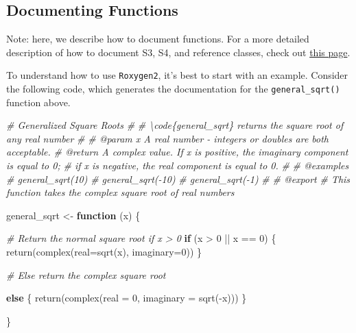 \documentclass[
]{book}
\newenvironment{Shaded}{\begin{snugshade}}{\end{snugshade}}
\newcommand{\AttributeTok}[1]{\textcolor[rgb]{0.77,0.63,0.00}{#1}}
\newcommand{\CommentTok}[1]{\textcolor[rgb]{0.56,0.35,0.01}{\textit{#1}}}
\newcommand{\ControlFlowTok}[1]{\textcolor[rgb]{0.13,0.29,0.53}{\textbf{#1}}}
\newcommand{\DecValTok}[1]{\textcolor[rgb]{0.00,0.00,0.81}{#1}}
\newcommand{\FunctionTok}[1]{\textcolor[rgb]{0.00,0.00,0.00}{#1}}
\newcommand{\NormalTok}[1]{#1}
\newcommand{\OtherTok}[1]{\textcolor[rgb]{0.56,0.35,0.01}{#1}}
\newcommand{\SpecialCharTok}[1]{\textcolor[rgb]{0.00,0.00,0.00}{#1}}
\begin{document}
\hypertarget{documenting-functions}{%
\subsection{Documenting Functions}\label{documenting-functions}}

Note: here, we describe how to document functions. For a more detailed description of how to document S3, S4, and reference classes, check out \href{http://r-pkgs.had.co.nz/man.html}{this page}.

To understand how to use \texttt{Roxygen2}, it's best to start with an example. Consider the following code, which generates the documentation for the \texttt{general\_sqrt()} function above.

\begin{Shaded}
\begin{Highlighting}[]
\CommentTok{\#\textquotesingle{} Generalized Square Roots}
\CommentTok{\#\textquotesingle{}}
\CommentTok{\#\textquotesingle{} \textbackslash{}code\{general\_sqrt\} returns the square root of any real number}
\CommentTok{\#\textquotesingle{}}
\CommentTok{\#\textquotesingle{} @param x A real number {-} integers or doubles are both acceptable.}
\CommentTok{\#\textquotesingle{} @return A complex value. If x is positive, the imaginary component is equal to 0;}
\CommentTok{\#\textquotesingle{} if x is negative, the real component is equal to 0.}
\CommentTok{\#\textquotesingle{}}
\CommentTok{\#\textquotesingle{} @examples}
\CommentTok{\#\textquotesingle{} general\_sqrt(10)}
\CommentTok{\#\textquotesingle{} general\_sqrt({-}10)}
\CommentTok{\#\textquotesingle{} general\_sqrt({-}1)}
\CommentTok{\#\textquotesingle{}}
\CommentTok{\#\textquotesingle{} @export}
\CommentTok{\# This function takes the complex square root of real numbers}

\NormalTok{general\_sqrt }\OtherTok{\textless{}{-}} \ControlFlowTok{function}\NormalTok{ (x) \{}

  \CommentTok{\# Return the normal square root if x \textgreater{} 0}
  \ControlFlowTok{if}\NormalTok{ (x }\SpecialCharTok{\textgreater{}} \DecValTok{0} \SpecialCharTok{||}\NormalTok{ x }\SpecialCharTok{==} \DecValTok{0}\NormalTok{) \{}
    \FunctionTok{return}\NormalTok{(}\FunctionTok{complex}\NormalTok{(}\AttributeTok{real=}\FunctionTok{sqrt}\NormalTok{(x), }\AttributeTok{imaginary=}\DecValTok{0}\NormalTok{))}
\NormalTok{  \}}

  \CommentTok{\# Else return the complex square root}

  \ControlFlowTok{else}\NormalTok{ \{}
    \FunctionTok{return}\NormalTok{(}\FunctionTok{complex}\NormalTok{(}\AttributeTok{real =} \DecValTok{0}\NormalTok{, }\AttributeTok{imaginary =} \FunctionTok{sqrt}\NormalTok{(}\SpecialCharTok{{-}}\NormalTok{x)))}
\NormalTok{  \}}

\NormalTok{\}}
\end{Highlighting}
\end{Shaded}
\end{document}
